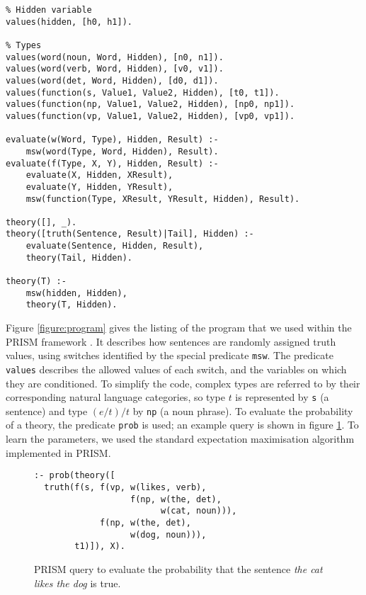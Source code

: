 \documentclass[letterpaper]{article}
\begin{document}
\begin{figure*}
\centering
\begin{lstlisting}
% Hidden variable
values(hidden, [h0, h1]).

% Types
values(word(noun, Word, Hidden), [n0, n1]).
values(word(verb, Word, Hidden), [v0, v1]).
values(word(det, Word, Hidden), [d0, d1]).
values(function(s, Value1, Value2, Hidden), [t0, t1]).
values(function(np, Value1, Value2, Hidden), [np0, np1]).
values(function(vp, Value1, Value2, Hidden), [vp0, vp1]).

evaluate(w(Word, Type), Hidden, Result) :-
	msw(word(Type, Word, Hidden), Result).
evaluate(f(Type, X, Y), Hidden, Result) :-
	evaluate(X, Hidden, XResult),
	evaluate(Y, Hidden, YResult),
	msw(function(Type, XResult, YResult, Hidden), Result).

theory([], _).
theory([truth(Sentence, Result)|Tail], Hidden) :-
	evaluate(Sentence, Hidden, Result),
	theory(Tail, Hidden).

theory(T) :-
	msw(hidden, Hidden),
	theory(T, Hidden).
\end{lstlisting}
\caption{A PRISM program describing probability distributions over
  natural language models used for our examples.}
\label{figure:program}
\end{figure*}

Figure \ref{figure:program} gives the listing of the program that we
used within the PRISM framework \cite{Sato:97}. It describes how
sentences are randomly assigned truth values, using switches
identified by the special predicate \texttt{msw}. The predicate
\texttt{values} describes the allowed values of each switch, and the
variables on which they are conditioned. To simplify the code, complex
types are referred to by their corresponding natural language
categories, so type $t$ is represented by \texttt{s} (a sentence) and
type $(e/t)/t$ by \texttt{np} (a noun phrase). To evaluate the
probability of a theory, the predicate \texttt{prob} is used; an
example query is shown in figure \ref{figure:query}. To learn the
parameters, we used the standard expectation maximisation algorithm
implemented in PRISM.

\begin{figure}
\begin{lstlisting}
:- prob(theory([
  truth(f(s, f(vp, w(likes, verb),
                   f(np, w(the, det),
                         w(cat, noun))),
             f(np, w(the, det),
                   w(dog, noun))),
        t1)]), X).
\end{lstlisting}
\caption{PRISM query to evaluate the probability that the sentence
  \emph{the cat likes the dog} is true.}
\label{figure:query}
\end{figure}
\end{document}
